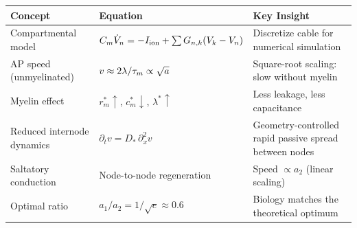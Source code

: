 \begin{chaptersummary}

\begin{center}
\renewcommand{\arraystretch}{1.6}
\begin{tabularx}{\textwidth}{@{}l X X@{}}
  \toprule
  \textbf{Concept} & \textbf{Equation} & \textbf{Key Insight} \\
  \midrule
  Compartmental model &
  $C_m\dot{V}_n = -I_{\text{ion}} + \sum G_{n,k}(V_k - V_n)$ &
  Discretize cable for numerical simulation \\
  AP speed (unmyelinated) &
  $v \approx 2\lambda/\tau_m \propto \sqrt{a}$ &
  Square-root scaling: slow without myelin \\
  Myelin effect &
  $r_m^* \uparrow$, $c_m^* \downarrow$, $\lambda^* \uparrow$ &
  Less leakage, less capacitance \\
  Reduced internode dynamics &
  $\partial_t v = D_*\,\partial_x^2 v$ &
  Geometry-controlled rapid passive spread between nodes \\
  Saltatory conduction &
  Node-to-node regeneration &
  Speed $\propto a_2$ (linear scaling) \\
  Optimal ratio &
  $a_1/a_2 = 1/\sqrt{e} \approx 0.6$ &
  Biology matches the theoretical optimum \\
  \bottomrule
\end{tabularx}
\end{center}

\end{chaptersummary}

